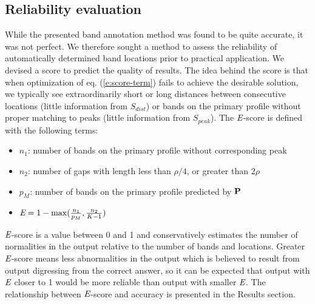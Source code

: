 \subsection{Reliability evaluation}\label{ss:reliability-evaluation}
While the presented band annotation method was found to be quite accurate, it was not perfect. We therefore sought a method to assess the reliability of automatically determined band locations prior to practical application. We devised a score to predict the quality of results. The idea behind the score is that when optimization of eq. (\ref{e:score-term}) fails to achieve the desirable solution, we typically see extraordinarily short or long distances between consecutive locations (little information from $S_{dist}$) or bands on the primary profile without proper matching to peaks (little information from $S_{peak}$). The ${\emph{E}}$-score is defined with the following terms:
\begin{itemize}
\item $n_1$: number of bands on the primary profile without corresponding peak
\item $n_2$: number of gaps with length less than $\rho/4$, or greater than $2\rho$
\item $p_M$: number of bands on the primary profile predicted by ${\mathbf{P}}$
\item ${\emph{E}} = 1 - {\max({{n_1} \over {p_M}}, {{n_2} \over {K-1}})}$
\end{itemize}
${\emph{E}}$-score is a value between 0 and 1 and conservatively estimates the number of normalities in the output relative to the number of bands and locations. Greater ${\emph{E}}$-score means less abnormalities in the output which is believed to result from output digressing from the correct answer, so it can be expected that output with ${\emph{E}}$ closer to 1 would be more reliable than output with smaller ${\emph{E}}$. The relationship between ${\emph{E}}$-score and accuracy is presented in the Results section.

\begin{comment}
\subsection{Implementation}
We implemented the proposed method in the MATLAB programming environment (The MathWorks, http://www.mathworks.com) and are making it freely available for download at http://hitrace.stanford.edu.
(To be filled with data preparation...)
\end{comment}

